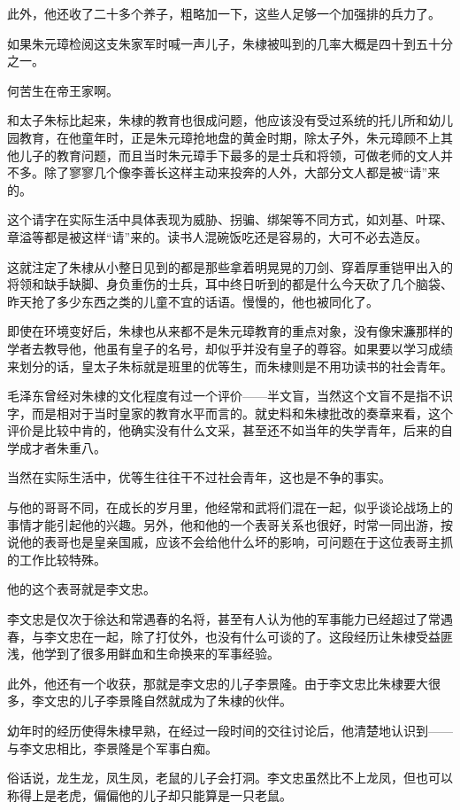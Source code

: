 \begin{multicols}{\theparacolNo}
		此外，他还收了二十多个养子，粗略加一下，这些人足够一个加强排的兵力了。

		如果朱元璋检阅这支朱家军时喊一声儿子，朱棣被叫到的几率大概是四十到五十分之一。

		何苦生在帝王家啊。

		和太子朱标比起来，朱棣的教育也很成问题，他应该没有受过系统的托儿所和幼儿园教育，在他童年时，正是朱元璋抢地盘的黄金时期，除太子外，朱元璋顾不上其他儿子的教育问题，而且当时朱元璋手下最多的是士兵和将领，可做老师的文人并不多。除了寥寥几个像李善长这样主动来投奔的人外，大部分文人都是被“请”来的。

		这个请字在实际生活中具体表现为威胁、拐骗、绑架等不同方式，如刘基、叶琛、章溢等都是被这样“请”来的。读书人混碗饭吃还是容易的，大可不必去造反。

		这就注定了朱棣从小整日见到的都是那些拿着明晃晃的刀剑、穿着厚重铠甲出入的将领和缺手缺脚、身负重伤的士兵，耳中终日听到的都是什么今天砍了几个脑袋、昨天抢了多少东西之类的儿童不宜的话语。慢慢的，他也被同化了。

		即使在环境变好后，朱棣也从来都不是朱元璋教育的重点对象，没有像宋濂那样的学者去教导他，他虽有皇子的名号，却似乎并没有皇子的尊容。如果要以学习成绩来划分的话，皇太子朱标就是班里的优等生，而朱棣则是不用功读书的社会青年。

		毛泽东曾经对朱棣的文化程度有过一个评价——半文盲，当然这个文盲不是指不识字，而是相对于当时皇家的教育水平而言的。就史料和朱棣批改的奏章来看，这个评价是比较中肯的，他确实没有什么文采，甚至还不如当年的失学青年，后来的自学成才者朱重八。

		当然在实际生活中，优等生往往干不过社会青年，这也是不争的事实。

		与他的哥哥不同，在成长的岁月里，他经常和武将们混在一起，似乎谈论战场上的事情才能引起他的兴趣。另外，他和他的一个表哥关系也很好，时常一同出游，按说他的表哥也是皇亲国戚，应该不会给他什么坏的影响，可问题在于这位表哥主抓的工作比较特殊。

		他的这个表哥就是李文忠。

		李文忠是仅次于徐达和常遇春的名将，甚至有人认为他的军事能力已经超过了常遇春，与李文忠在一起，除了打仗外，也没有什么可谈的了。这段经历让朱棣受益匪浅，他学到了很多用鲜血和生命换来的军事经验。

		此外，他还有一个收获，那就是李文忠的儿子李景隆。由于李文忠比朱棣要大很多，李文忠的儿子李景隆自然就成为了朱棣的伙伴。

		幼年时的经历使得朱棣早熟，在经过一段时间的交往讨论后，他清楚地认识到——与李文忠相比，李景隆是个军事白痴。

		俗话说，龙生龙，凤生凤，老鼠的儿子会打洞。李文忠虽然比不上龙凤，但也可以称得上是老虎，偏偏他的儿子却只能算是一只老鼠。


\end{multicols}
